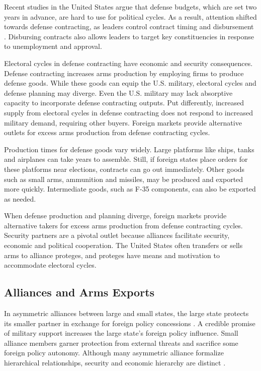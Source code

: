 \documentclass[12pt]{article}
\begin{document}
Recent studies in the United States argue that defense budgets, which are set two years in advance, are hard to use for political cycles.
As a result, attention shifted towards defense contracting, as leaders control contract timing and disbursement \citep{Mayer1995, DerouenHeo2000}.
Disbursing contracts also allows leaders to target key constituencies in response to unemployment and approval.


Electoral cycles in defense contracting have economic and security consequences.
Defense contracting increases arms production by employing firms to produce defense goods. 
While these goods can equip the U.S. military, electoral cycles and defense planning may diverge.
Even the U.S. military may lack absorptive capacity to incorporate defense contracting outputs.
Put differently, increased supply from electoral cycles in defense contracting does not respond to increased military demand, requiring other buyers. 
Foreign markets provide alternative outlets for excess arms production from defense contracting cycles. 


Production times for defense goods vary widely.
Large platforms like ships, tanks and airplanes can take years to assemble. 
Still, if foreign states place orders for these platforms near elections, contracts can go out immediately.
Other goods such as small arms, ammunition and missiles, may be produced and exported more quickly. 
Intermediate goods, such as F-35 components, can also be exported as needed. 


When defense production and planning diverge, foreign markets provide alternative takers for excess arms production from defense contracting cycles. 
Security partners are a pivotal outlet because alliances facilitate security, economic and political cooperation.
The United States often transfers or sells arms to alliance proteges, and proteges have means and motivation to accommodate electoral cycles. 



\subsection{Alliances and Arms Exports}


In asymmetric alliances between large and small states, the large state protects its smaller partner in exchange for foreign policy concessions \citep{Morrow1991}.
A credible promise of military support increases the large state's foreign policy influence. 
Small alliance members garner protection from external threats and sacrifice some foreign policy autonomy. 
Although many asymmetric alliance formalize hierarchical relationships, security and economic hierarchy are distinct \citep{Lake2009}. 
\end{document}
